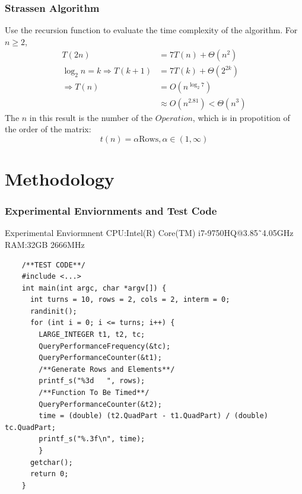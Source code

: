 \documentclass[cjk]{beamer}
\begin{document}
\begin{frame}
  \frametitle{Strassen Algorithm}

  Use the recursion function to evaluate the time complexity of the algorithm.
  For \(n\geqslant 2\),
  \begin{equation}
    \begin{aligned}
      T(2n)                          & =7T(n)+\Theta(n^{2})              \\
      \log_{2} n=k\Rightarrow T(k+1) & =7T(k)+\Theta(2^{2k})             \\
      \Rightarrow T(n)               & =O(n^{\log_{2}7})                 \\
                                     & \approx O(n^{2.81})<\Theta(n^{3})
    \end{aligned}
  \end{equation}
  The \(n\) in this result is the number of the \(Operation\), which is in propotition of the order of the matrix:
  \begin{equation}
    t(n)=\alpha \text{Rows},\alpha\in(1,\infty)
  \end{equation}
\end{frame}

\section{Methodology}
\begin{frame}[fragile]
  \frametitle{Experimental Enviornments and Test Code}
  \begin{block}{Experimental Enviormnent}
    \small
    CPU:Intel(R) Core(TM) i7-9750HQ@3.85\~\ 4.05GHz\\
    RAM:32GB 2666MHz
  \end{block}
  \begin{lstlisting}
    /**TEST CODE**/
    #include <...>
    int main(int argc, char *argv[]) {
      int turns = 10, rows = 2, cols = 2, interm = 0;
      randinit();
      for (int i = 0; i <= turns; i++) {
        LARGE_INTEGER t1, t2, tc;
        QueryPerformanceFrequency(&tc);
        QueryPerformanceCounter(&t1);
        /**Generate Rows and Elements**/
        printf_s("%3d   ", rows);
        /**Function To Be Timed**/
        QueryPerformanceCounter(&t2);
        time = (double) (t2.QuadPart - t1.QuadPart) / (double) tc.QuadPart;
        printf_s("%.3f\n", time);
        }
      getchar();
      return 0;
    }
  \end{lstlisting}
\end{frame}
\end{document}
